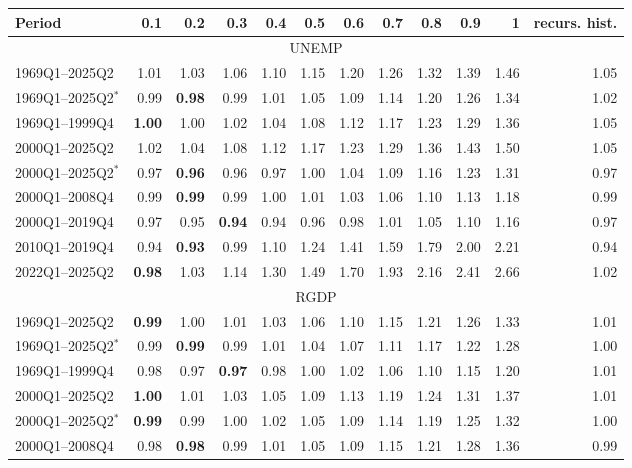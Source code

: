 \begin{tabular}{lrrrrrrrrrrr}
\hline
Period & 0.1 & 0.2 & 0.3 & 0.4 & 0.5 & 0.6 & 0.7 & 0.8 & 0.9 & 1 & recurs. hist. \\
\hline
\multicolumn{12}{c}{UNEMP} \\
1969Q1--2025Q2 & 1.01 & 1.03 & 1.06 & 1.10 & 1.15 & 1.20 & 1.26 & 1.32 & 1.39 & 1.46 & 1.05 \\
1969Q1--2025Q2$^*$ & 0.99 & \textbf{0.98} & 0.99 & 1.01 & 1.05 & 1.09 & 1.14 & 1.20 & 1.26 & 1.34 & 1.02 \\
1969Q1--1999Q4 & \textbf{1.00} & 1.00 & 1.02 & 1.04 & 1.08 & 1.12 & 1.17 & 1.23 & 1.29 & 1.36 & 1.05 \\
2000Q1--2025Q2 & 1.02 & 1.04 & 1.08 & 1.12 & 1.17 & 1.23 & 1.29 & 1.36 & 1.43 & 1.50 & 1.05 \\
2000Q1--2025Q2$^*$ & 0.97 & \textbf{0.96} & 0.96 & 0.97 & 1.00 & 1.04 & 1.09 & 1.16 & 1.23 & 1.31 & 0.97 \\
2000Q1--2008Q4 & 0.99 & \textbf{0.99} & 0.99 & 1.00 & 1.01 & 1.03 & 1.06 & 1.10 & 1.13 & 1.18 & 0.99 \\
2000Q1--2019Q4 & 0.97 & 0.95 & \textbf{0.94} & 0.94 & 0.96 & 0.98 & 1.01 & 1.05 & 1.10 & 1.16 & 0.97 \\
2010Q1--2019Q4 & 0.94 & \textbf{0.93} & 0.99 & 1.10 & 1.24 & 1.41 & 1.59 & 1.79 & 2.00 & 2.21 & 0.94 \\
2022Q1--2025Q2 & \textbf{0.98} & 1.03 & 1.14 & 1.30 & 1.49 & 1.70 & 1.93 & 2.16 & 2.41 & 2.66 & 1.02 \\
\hline
\multicolumn{12}{c}{RGDP} \\
1969Q1--2025Q2 & \textbf{0.99} & 1.00 & 1.01 & 1.03 & 1.06 & 1.10 & 1.15 & 1.21 & 1.26 & 1.33 & 1.01 \\
1969Q1--2025Q2$^*$ & 0.99 & \textbf{0.99} & 0.99 & 1.01 & 1.04 & 1.07 & 1.11 & 1.17 & 1.22 & 1.28 & 1.00 \\
1969Q1--1999Q4 & 0.98 & 0.97 & \textbf{0.97} & 0.98 & 1.00 & 1.02 & 1.06 & 1.10 & 1.15 & 1.20 & 1.01 \\
2000Q1--2025Q2 & \textbf{1.00} & 1.01 & 1.03 & 1.05 & 1.09 & 1.13 & 1.19 & 1.24 & 1.31 & 1.37 & 1.01 \\
2000Q1--2025Q2$^*$ & \textbf{0.99} & 0.99 & 1.00 & 1.02 & 1.05 & 1.09 & 1.14 & 1.19 & 1.25 & 1.32 & 1.00 \\
2000Q1--2008Q4 & 0.98 & \textbf{0.98} & 0.99 & 1.01 & 1.05 & 1.09 & 1.15 & 1.21 & 1.28 & 1.36 & 0.99 \\

\end{tabular}
